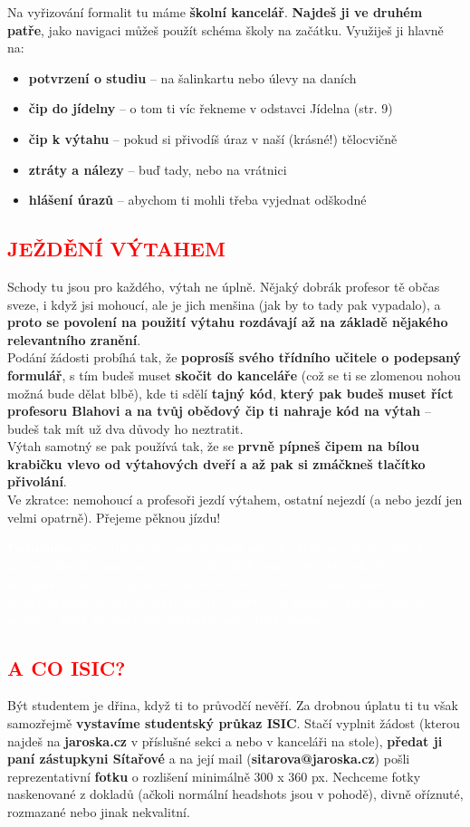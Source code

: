 \documentclass{article}
\newcommand{\podnadpis}[1]{
  \subsection*{\textcolor{red}{#1}}
}
\begin{document}
Na vyřizování formalit tu máme \textbf{školní kancelář}. \textbf{Najdeš ji ve druhém patře}, jako
navigaci můžeš použít schéma školy na začátku.
Využiješ ji hlavně na:
\begin{itemize}[leftmargin=10pt]
  \item \textbf{potvrzení o studiu} -- na šalinkartu nebo úlevy na daních
  \item \textbf{čip do jídelny} -- o tom ti víc řekneme v odstavci Jídelna (str. 9)
  \item \textbf{čip k výtahu} -- pokud si přivodíš úraz v naší (krásné!) tělocvičně
  \item \textbf{ztráty a nálezy} -- buď tady, nebo na vrátnici
  \item \textbf{hlášení úrazů} -- abychom ti mohli třeba vyjednat odškodné
\end{itemize}

\podnadpis{JEŽDĚNÍ VÝTAHEM}
Schody tu jsou pro každého, výtah ne úplně. Nějaký dobrák profesor tě občas sveze, i když jsi mohoucí, ale je jich menšina (jak by to tady pak vypadalo), a \textbf{proto se povolení na použití výtahu rozdávají až na základě nějakého relevantního zranění}. \\
Podání žádosti probíhá tak, že \textbf{poprosíš svého třídního učitele o podepsaný formulář}, s tím budeš muset \textbf{skočit do kanceláře} (což se ti se zlomenou nohou možná bude dělat blbě), kde ti sdělí \textbf{tajný kód}, \textbf{který pak budeš muset říct profesoru Blahovi a na tvůj
obědový čip ti nahraje kód na výtah} -- budeš tak mít už dva důvody ho neztratit. \\
Výtah samotný se pak používá tak, že se \textbf{prvně pípneš čipem na bílou krabičku
vlevo od výtahových dveří a až pak si zmáčkneš tlačítko přivolání}. \\
Ve zkratce: nemohoucí a profesoři jezdí výtahem, ostatní nejezdí (a nebo jezdí jen
velmi opatrně). Přejeme pěknou jízdu!

\begin{redbox}
  \textcolor{white}{\footnotesize \textbf{Poznámka.} Ne že bys nejen nesměl jezdit zdravý výtahem, ono to taky dost dobře nejde. Bez oprávnění na čipu tě výtah prostě nebude poslouchat a nepřijede ti. Když už je mysteriózně otevřen na patře prázdný, nikdo ti asi nebude fyzicky bránit do něj naskočit a odjet – ale pokud tě při tom načapá profesor, který to nemá rád, dostaneš bídu. Takže bacha.}
\end{redbox}

\podnadpis{A CO ISIC?}
Být studentem je dřina, když ti to průvodčí nevěří. Za drobnou úplatu ti tu však samozřejmě \textbf{vystavíme studentský průkaz ISIC}. Stačí vyplnit žádost (kterou najdeš na {\bf jaroska.cz} v příslušné sekci a nebo v kanceláři na stole), \textbf{předat ji paní zástupkyni Sítařové} a na její mail (\textbf{sitarova@jaroska.cz}) pošli reprezentativní \textbf{fotku} o rozlišení minimálně 300 x 360 px. Nechceme fotky naskenované z dokladů (ačkoli normální headshots jsou v pohodě), divně oříznuté, rozmazané nebo jinak
nekvalitní.
\end{document}
